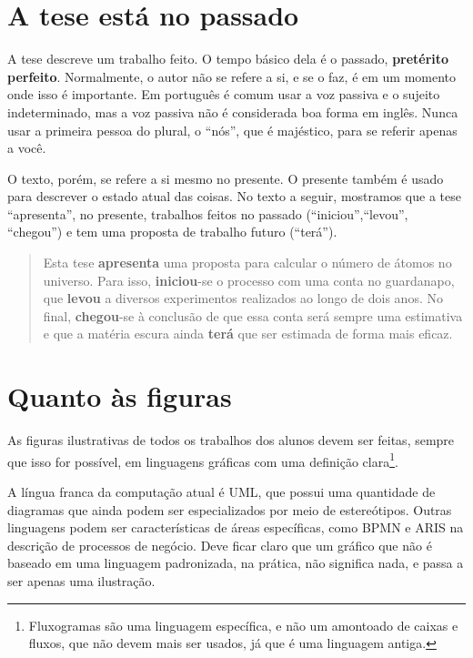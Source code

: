 \section{A tese está no passado}

A tese descreve um trabalho feito. O tempo básico dela é o passado,\textbf{ pretérito perfeito}. Normalmente, o autor não se refere a si, e se o faz, é em um momento onde isso é importante. Em português é comum usar a voz passiva e o sujeito indeterminado, mas a voz passiva não é considerada boa forma em inglês. Nunca usar a primeira pessoa do plural, o ``nós'', que é majéstico, para se referir apenas a você.

O texto, porém, se refere a si mesmo no presente. O presente também é usado para descrever o estado atual das coisas. No texto a seguir, mostramos que a tese ``apresenta'', no presente, trabalhos feitos no passado (``iniciou'',``levou'', ``chegou'') e tem uma proposta de trabalho futuro (``terá'').

\begin{quote}
Esta tese \textbf{apresenta} uma proposta para calcular o número de átomos no universo. Para isso, \textbf{iniciou}-se o processo com uma conta no guardanapo, que \textbf{levou} a diversos experimentos realizados ao longo de dois anos. No final, \textbf{chegou}-se à conclusão de que essa conta será sempre uma estimativa e que a matéria escura ainda \textbf{terá} que ser estimada de forma mais eficaz.
\end{quote}

\section{Quanto às figuras}

As figuras ilustrativas de todos os trabalhos dos alunos devem ser feitas, sempre que isso for possível, em linguagens gráficas com uma definição clara\footnote{Fluxogramas são uma linguagem específica, e não um amontoado de caixas e fluxos, que não devem mais ser usados, já que é uma linguagem antiga.}. 

A língua franca da computação atual é UML, que possui uma quantidade de diagramas que ainda podem ser especializados por meio de estereótipos. Outras linguagens podem ser características de áreas específicas, como BPMN e ARIS na descrição de processos de negócio. Deve ficar claro que um gráfico que não é baseado em uma linguagem padronizada, na prática, não significa nada, e passa a ser apenas uma ilustração.

